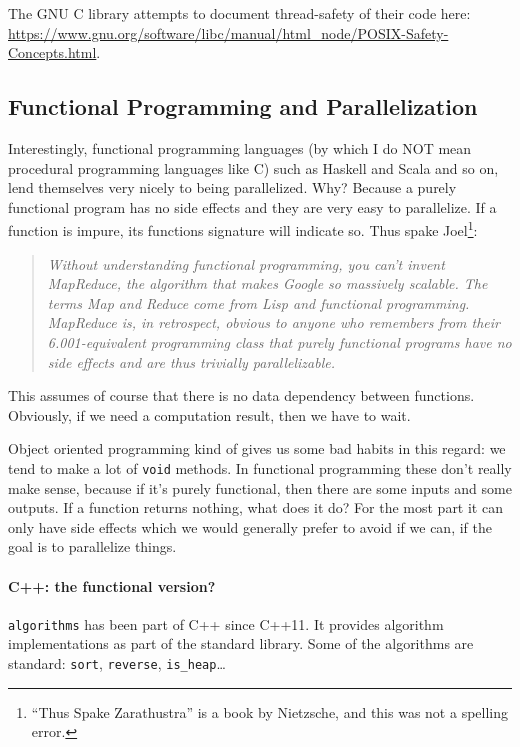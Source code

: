 \documentclass[a4paper]{report}
\begin{document}
The GNU C library attempts to document thread-safety of their code here:
\url{https://www.gnu.org/software/libc/manual/html_node/POSIX-Safety-Concepts.html}.

\subsection*{Functional Programming and Parallelization}
Interestingly, functional programming languages (by which I do NOT mean procedural programming languages like C) such as Haskell and Scala and so on, lend themselves very nicely to being parallelized. Why? Because a purely functional program has no side effects and they are very easy to parallelize. If a function is impure, its functions signature will indicate so. Thus spake Joel\footnote{``Thus Spake Zarathustra'' is a book by Nietzsche, and this was not a spelling error.}:

\begin{quote}
\textit{Without understanding functional programming, you can't invent MapReduce, the algorithm that makes Google so massively scalable. The terms Map and Reduce come from Lisp and functional programming. MapReduce is, in retrospect, obvious to anyone who remembers from their 6.001-equivalent programming class that purely functional programs have no side effects and are thus trivially parallelizable.}~\cite{joel:functional}
\end{quote}

This assumes of course that there is no data dependency between functions. Obviously, if we need a computation result, then we have to wait. 

Object oriented programming kind of gives us some bad habits in this regard: we tend to make a lot of \texttt{void} methods. In functional programming these don't really make sense, because if it's purely functional, then there are some inputs and some outputs. If a function returns nothing, what does it do? For the most part it can only have side effects which we would generally prefer to avoid if we can, if the goal is to parallelize things. 

\paragraph{C++: the functional version?} {\tt algorithms} has been part of C++ since C++11. It provides algorithm implementations as part of the standard library. Some of the algorithms are standard: {\tt sort}, {\tt reverse}, {\tt is\_heap}\ldots
\end{document}
